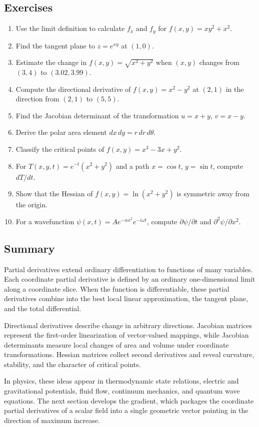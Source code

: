 \subsection{Exercises}

\begin{enumerate}
\item Use the limit definition to calculate $f_x$ and $f_y$ for $f(x,y)=xy^2+x^2$.
\item Find the tangent plane to $z=e^{xy}$ at $(1,0)$.
\item Estimate the change in $f(x,y)=\sqrt{x^2+y^2}$ when $(x,y)$ changes from $(3,4)$ to $(3.02,3.99)$.
\item Compute the directional derivative of $f(x,y)=x^2-y^2$ at $(2,1)$ in the direction from $(2,1)$ to $(5,5)$.
\item Find the Jacobian determinant of the transformation $u=x+y$, $v=x-y$.
\item Derive the polar area element $dx\,dy=r\,dr\,d\theta$.
\item Classify the critical points of $f(x,y)=x^3-3x+y^2$.
\item For $T(x,y,t)=e^{-t}(x^2+y^2)$ and a path $x=\cos t$, $y=\sin t$, compute $dT/dt$.
\item Show that the Hessian of $f(x,y)=\ln(x^2+y^2)$ is symmetric away from the origin.
\item For a wavefunction $\psi(x,t)=Ae^{-\alpha x^2}e^{-i\omega t}$, compute $\partial\psi/\partial t$ and $\partial^2\psi/\partial x^2$.
\end{enumerate}

\subsection*{Summary}

Partial derivatives extend ordinary differentiation to functions of many variables. Each coordinate partial derivative is defined by an ordinary one-dimensional limit along a coordinate slice. When the function is differentiable, these partial derivatives combine into the best local linear approximation, the tangent plane, and the total differential.

Directional derivatives describe change in arbitrary directions. Jacobian matrices represent the first-order linearization of vector-valued mappings, while Jacobian determinants measure local changes of area and volume under coordinate transformations. Hessian matrices collect second derivatives and reveal curvature, stability, and the character of critical points.

In physics, these ideas appear in thermodynamic state relations, electric and gravitational potentials, fluid flow, continuum mechanics, and quantum wave equations. The next section develops the gradient, which packages the coordinate partial derivatives of a scalar field into a single geometric vector pointing in the direction of maximum increase.
